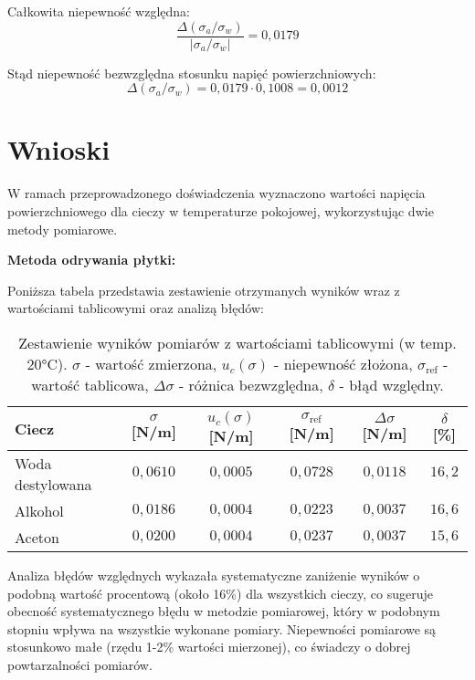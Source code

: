 \documentclass[a4paper,12pt]{article}
\begin{document}
Całkowita niepewność względna:
$$\frac{\Delta(\sigma_a/\sigma_w)}{|\sigma_a/\sigma_w|} = 0{,}0179$$

Stąd niepewność bezwzględna stosunku napięć powierzchniowych:
$$\Delta(\sigma_a/\sigma_w) = 0{,}0179 \cdot 0{,}1008 = 0{,}0012$$

\section{Wnioski}

W ramach przeprowadzonego doświadczenia wyznaczono wartości napięcia powierzchniowego dla cieczy w temperaturze pokojowej, wykorzystując dwie metody pomiarowe.

\noindent\textbf{Metoda odrywania płytki:}

Poniższa tabela przedstawia zestawienie otrzymanych wyników wraz z wartościami tablicowymi oraz analizą błędów:

\begin{table}[H]
    \centering
    \begin{tabular}{|l|c|c|c|c|c|}
        \hline
        \textbf{Ciecz} & \textbf{$\sigma$ [N/m]} & \textbf{$u_c(\sigma)$ [N/m]} & \textbf{$\sigma_{\text{ref}}$ [N/m]} & \textbf{$\Delta\sigma$ [N/m]} & \textbf{$\delta$ [\%]} \\
        \hline
        Woda destylowana & $0{,}0610$ & $0{,}0005$ & $0{,}0728$ & $0{,}0118$ & $16{,}2$ \\
        \hline
        Alkohol & $0{,}0186$ & $0{,}0004$ & $0{,}0223$ & $0{,}0037$ & $16{,}6$ \\
        \hline
        Aceton & $0{,}0200$ & $0{,}0004$ & $0{,}0237$ & $0{,}0037$ & $15{,}6$ \\
        \hline
    \end{tabular}
    \caption{Zestawienie wyników pomiarów z wartościami tablicowymi (w temp. 20°C).  $\sigma$ - wartość zmierzona, $u_c(\sigma)$ - niepewność złożona, $\sigma_{\text{ref}}$ - wartość tablicowa, $\Delta\sigma$ - różnica bezwzględna, $\delta$ - błąd względny.}
    \label{tab:wyniki_koncowe}
\end{table}

Analiza błędów względnych wykazała systematyczne zaniżenie wyników o podobną wartość procentową (około 16\%) dla wszystkich cieczy, co sugeruje obecność systematycznego błędu w metodzie pomiarowej, który w podobnym stopniu wpływa na wszystkie wykonane pomiary. Niepewności pomiarowe są stosunkowo małe (rzędu 1-2\% wartości mierzonej), co świadczy o dobrej powtarzalności pomiarów.
\end{document}
